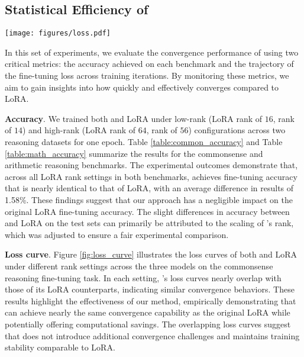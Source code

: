 

\subsection{Statistical Efficiency of \celora}

\begin{figure*}[!t]
  \centering
    \texttt{[image: figures/loss.pdf]}
  \vspace{-5mm}
  \caption{Loss curve of commonsense reasoning fine-tune task. Each row in the figure corresponds to a different trainable parameter setting, while each column represents base models: LLaMA2-7B/13B and LLaMA3.1-8B.}
  \label{fig:loss_curve}
\end{figure*}

In this set of experiments, we evaluate the convergence performance of \celora using two critical metrics: the accuracy achieved on each benchmark and the trajectory of the fine-tuning loss across training iterations. 
% 
By monitoring these metrics, we aim to gain insights into how quickly and effectively \celora converges compared to LoRA.
%


\textbf{Accuracy}. %
We trained both \celora and LoRA under low-rank (LoRA rank of $16$, \celora rank of $14$) and high-rank (LoRA rank of $64$, \celora rank of $56$) configurations across two reasoning datasets for one epoch.
Table \ref{table:common_accuracy} and Table \ref{table:math_accuracy} summarize the results for the commonsense and arithmetic reasoning benchmarks.
% 
The experimental outcomes demonstrate that, across all LoRA rank settings in both benchmarks, \celora achieves fine-tuning accuracy that is nearly identical to that of LoRA, with an average difference in results of 1.58\%.
%
These findings suggest that our approach has a negligible impact on the original LoRA fine-tuning accuracy.
% 
The slight differences in accuracy between \celora and LoRA on the test sets can primarily be attributed to the scaling of \celora's rank, which was adjusted to ensure a fair experimental comparison.



\textbf{Loss curve}.
Figure \ref{fig:loss_curve} illustrates the loss curves of both \celora and LoRA under different rank settings across the three models on the commonsense reasoning fine-tuning task.
% 
In each setting, \celora's loss curves nearly overlap with those of its LoRA counterparts, indicating similar convergence behaviors.
% 
These results highlight the effectiveness of our method, empirically demonstrating that \celora can achieve nearly the same convergence capability as the original LoRA while potentially offering computational savings. 
% 
The overlapping loss curves suggest that \celora does not introduce additional convergence challenges and maintains training stability comparable to LoRA.



